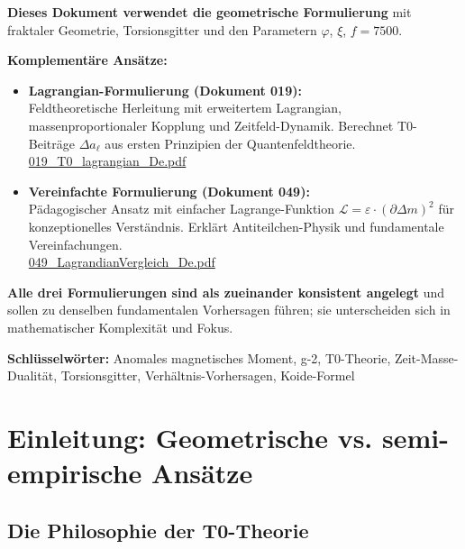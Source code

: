 	\begin{tcolorbox}[colback=blue!10!white, colframe=blue!75!black, title=Alternative Formulierungen der T0-Theorie]
		\textbf{Dieses Dokument verwendet die geometrische Formulierung} mit fraktaler Geometrie, Torsionsgitter und den Parametern $\varphi$, $\xi$, $f = 7500$.
		
		\textbf{Komplementäre Ansätze:}
		\begin{itemize}
			\item \textbf{Lagrangian-Formulierung (Dokument 019):} \\
			Feldtheoretische Herleitung mit erweitertem Lagrangian, massenproportionaler Kopplung und Zeitfeld-Dynamik. Berechnet T0-Beiträge $\Delta a_\ell$ aus ersten Prinzipien der Quantenfeldtheorie. \\
			\rightarrow \href{https://github.com/jpascher/T0-Time-Mass-Duality/blob/main/2/pdf/019_T0_lagrangian_De.pdf}{019\_T0\_lagrangian\_De.pdf}
			
			\item \textbf{Vereinfachte Formulierung (Dokument 049):} \\
			Pädagogischer Ansatz mit einfacher Lagrange-Funktion $\mathcal{L} = \varepsilon \cdot (\partial \Delta m)^2$ für konzeptionelles Verständnis. Erklärt Antiteilchen-Physik und fundamentale Vereinfachungen. \\
			\rightarrow \href{https://github.com/jpascher/T0-Time-Mass-Duality/blob/main/2/pdf/049_LagrandianVergleich_De.pdf}{049\_LagrandianVergleich\_De.pdf}
		\end{itemize}
		
		\textbf{Alle drei Formulierungen sind als zueinander konsistent angelegt} und sollen zu denselben fundamentalen Vorhersagen führen; sie unterscheiden sich in mathematischer Komplexität und Fokus.
	\end{tcolorbox}
	
	\textbf{Schlüsselwörter:} Anomales magnetisches Moment, g-2, T0-Theorie, Zeit-Masse-Dualität, Torsionsgitter, Verhältnis-Vorhersagen, Koide-Formel
	
	
	\section{Einleitung: Geometrische vs. semi-empirische Ansätze}
	
	\subsection{Die Philosophie der T0-Theorie}
	
